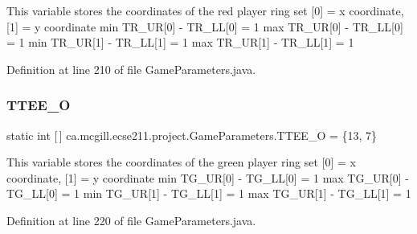 This variable stores the coordinates of the red player ring set \mbox{[}0\mbox{]} = x coordinate, \mbox{[}1\mbox{]} = y coordinate min T\+R\+\_\+\+UR\mbox{[}0\mbox{]} -\/ T\+R\+\_\+\+LL\mbox{[}0\mbox{]} = 1 max T\+R\+\_\+\+UR\mbox{[}0\mbox{]} -\/ T\+R\+\_\+\+LL\mbox{[}0\mbox{]} = 1 min T\+R\+\_\+\+UR\mbox{[}1\mbox{]} -\/ T\+R\+\_\+\+LL\mbox{[}1\mbox{]} = 1 max T\+R\+\_\+\+UR\mbox{[}1\mbox{]} -\/ T\+R\+\_\+\+LL\mbox{[}1\mbox{]} = 1 

Definition at line 210 of file Game\+Parameters.\+java.

\mbox{\label{enumca_1_1mcgill_1_1ecse211_1_1project_1_1_game_parameters_a50543aed3d1731225cee6fe50ebcefe0}} 
\subsubsection{\texorpdfstring{T\+T\+E\+E\+\_\+O}{TTEE\_O}}
{\footnotesize\ttfamily  static  int \mbox{[}$\,$\mbox{]} ca.\+mcgill.\+ecse211.\+project.\+Game\+Parameters.\+T\+T\+E\+E\+\_\+O = \{13, 7\}\hspace{0.3cm}{\ttfamily [static]}}

This variable stores the coordinates of the green player ring set \mbox{[}0\mbox{]} = x coordinate, \mbox{[}1\mbox{]} = y coordinate min T\+G\+\_\+\+UR\mbox{[}0\mbox{]} -\/ T\+G\+\_\+\+LL\mbox{[}0\mbox{]} = 1 max T\+G\+\_\+\+UR\mbox{[}0\mbox{]} -\/ T\+G\+\_\+\+LL\mbox{[}0\mbox{]} = 1 min T\+G\+\_\+\+UR\mbox{[}1\mbox{]} -\/ T\+G\+\_\+\+LL\mbox{[}1\mbox{]} = 1 max T\+G\+\_\+\+UR\mbox{[}1\mbox{]} -\/ T\+G\+\_\+\+LL\mbox{[}1\mbox{]} = 1 

Definition at line 220 of file Game\+Parameters.\+java.

\mbox{\label{enumca_1_1mcgill_1_1ecse211_1_1project_1_1_game_parameters_a4b437dfb1ca3a0898631dfd670828202}} 
